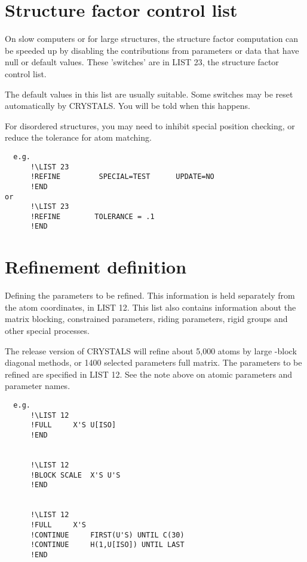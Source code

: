 \documentclass[10pt,a4paper]{report}
\begin{document}
\section{Structure factor control list}
 On slow computers or for large structures,
 the structure factor computation can be speeded up by disabling the
 contributions from parameters or data that have null or default values. These
 'switches' are in LIST 23, the structure factor control list.


The default values in this list are usually suitable.
 Some switches may be reset
 automatically by CRYSTALS. You will be told when this happens.


For disordered structures, you may need to inhibit special position
checking, or reduce the tolerance for atom matching.

\small\begin{verbatim}
  e.g.
      !\LIST 23
      !REFINE         SPECIAL=TEST      UPDATE=NO
      !END
or
      !\LIST 23
      !REFINE        TOLERANCE = .1
      !END
\end{verbatim}\normalsize





\section{Refinement definition}


Defining the parameters to be refined. This information is held separately
 from the atom coordinates, in LIST 12. This list also contains information
 about the matrix blocking, constrained parameters, riding parameters, rigid
 groups and other special processes.




The release version of CRYSTALS will refine about 5,000 atoms by large -block
 diagonal methods, or 1400 selected parameters full matrix. The parameters to
 be refined are specified in LIST 12. See the note above on atomic
 parameters and parameter names.

\small\begin{verbatim}
  e.g.
      !\LIST 12
      !FULL     X'S U[ISO]
      !END


      !\LIST 12
      !BLOCK SCALE  X'S U'S
      !END


      !\LIST 12
      !FULL     X'S
      !CONTINUE     FIRST(U'S) UNTIL C(30)
      !CONTINUE     H(1,U[ISO]) UNTIL LAST
      !END
\end{verbatim}\normalsize
\end{document}
